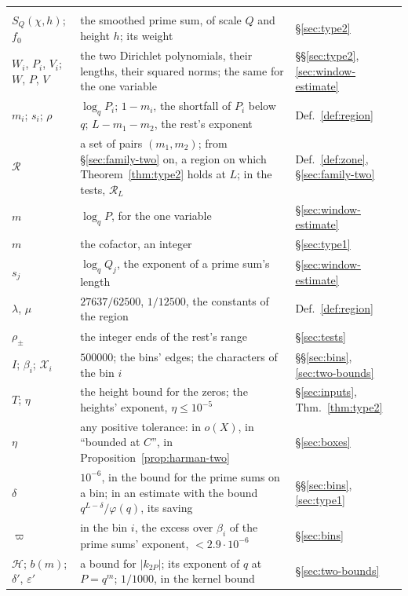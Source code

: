 \documentclass[11pt]{article}
\theoremstyle{definition}
\begin{document}
{\begin{longtable}{@{}>{\raggedright\arraybackslash}p{}
  >{\raggedright\arraybackslash}p{}
  >{\raggedright\arraybackslash}p{}@{}}
\midrule
\multicolumn{3}{@{}l}{\emph{The Type~II estimates}} \\
$S_Q(\chi, h)$; $f_0$ & the smoothed prime sum, of scale $Q$ and height $h$; its weight & \S\ref{sec:type2} \\
$W_i$, $P_i$, $V_i$; $W$, $P$, $V$ & the two Dirichlet polynomials, their lengths, their squared norms; the same
  for the one variable & \S\S\ref{sec:type2}, \ref{sec:window-estimate} \\
$m_i$; $s_i$; $\rho$ & $\log_q P_i$; $1 - m_i$, the shortfall of $P_i$ below $q$; $L - m_1 - m_2$, the rest's exponent &
  Def.~\ref{def:region} \\
$\mathcal R$ & a set of pairs $(m_1, m_2)$; from \S\ref{sec:family-two} on, a region on which
  Theorem~\ref{thm:type2} holds at $L$; in the tests, $\mathcal R_L$ & Def.~\ref{def:zone},
  \S\ref{sec:family-two} \\
$m$ & $\log_q P$, for the one variable & \S\ref{sec:window-estimate} \\
$m$ & the cofactor, an integer & \S\ref{sec:type1} \\
$s_j$ & $\log_q Q_j$, the exponent of a prime sum's length & \S\ref{sec:window-estimate} \\
$\lambda$, $\mu$ & $27637/62500$, $1/12500$, the constants of the region & Def.~\ref{def:region} \\
$\rho_\pm$ & the integer ends of the rest's range & \S\ref{sec:tests} \\
$I$; $\beta_i$; $\mathcal X_i$ & $500000$; the bins' edges; the characters of the bin $i$ & \S\S\ref{sec:bins},
  \ref{sec:two-bounds} \\
$T$; $\eta$ & the height bound for the zeros; the heights' exponent, $\eta \le 10^{-5}$ & \S\ref{sec:inputs},
  Thm.~\ref{thm:type2} \\
$\eta$ & any positive tolerance: in $o(X)$, in ``bounded at $C$'', in Proposition~\ref{prop:harman-two} &
  \S\ref{sec:boxes} \\
$\delta$ & $10^{-6}$, in the bound for the prime sums on a bin; in an estimate with the bound $q^{L -
  \delta}/\varphi(q)$, its saving & \S\S\ref{sec:bins}, \ref{sec:type1} \\
$\varpi$ & in the bin $i$, the excess over $\beta_i$ of the prime sums' exponent, $< 2.9 \cdot 10^{-6}$ &
  \S\ref{sec:bins} \\
$\mathcal H$; $b(m)$; $\delta'$, $\varepsilon'$ & a bound for $|k_{2P}|$; its exponent of $q$ at $P = q^m$; $1/1000$,
  in the
  kernel bound & \S\ref{sec:two-bounds} \\

\end{longtable}}
\end{document}
